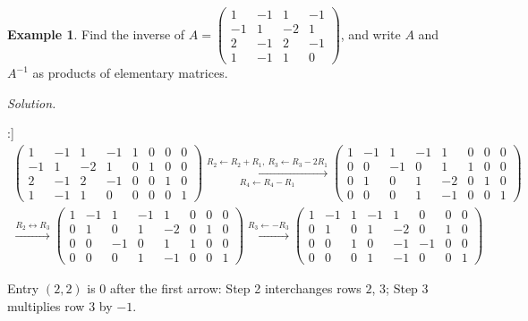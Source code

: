 \documentclass[12pt]{article}
\theoremstyle{definition}
\newtheorem{example}[theorem]{Example}
\begin{document}
\begin{example}\label{b2.20}
Find the inverse of \(A=\left(\begin{smallmatrix}1&-1&1&-1\\-1&1&-2&1\\2&-1&2&-1\\1&-1&1&0\end{smallmatrix}\right)\),
and write \(A\) and \(A^{-1}\) as products of elementary matrices.
\end{example}
\textit{Solution.}
\begin{board}[Forward elimination of \([A\mid I_4]\):]
\[
\begin{gathered}
\left(\begin{array}{cccc|cccc}1&-1&1&-1&1&0&0&0\\-1&1&-2&1&0&1&0&0\\2&-1&2&-1&0&0&1&0\\1&-1&1&0&0&0&0&1\end{array}\right)
\xrightarrow[R_4\leftarrow R_4-R_1]{R_2\leftarrow R_2+R_1,\ R_3\leftarrow R_3-2R_1}
\left(\begin{array}{cccc|cccc}1&-1&1&-1&1&0&0&0\\0&0&-1&0&1&1&0&0\\0&1&0&1&-2&0&1&0\\0&0&0&1&-1&0&0&1\end{array}\right)
\\
\xrightarrow{R_2\leftrightarrow R_3}
\left(\begin{array}{cccc|cccc}1&-1&1&-1&1&0&0&0\\0&1&0&1&-2&0&1&0\\0&0&-1&0&1&1&0&0\\0&0&0&1&-1&0&0&1\end{array}\right)
\xrightarrow{R_3\leftarrow-R_3}
\left(\begin{array}{cccc|cccc}1&-1&1&-1&1&0&0&0\\0&1&0&1&-2&0&1&0\\0&0&1&0&-1&-1&0&0\\0&0&0&1&-1&0&0&1\end{array}\right)
\end{gathered}
\]
\end{board}
Entry \((2,2)\) is \(0\) after the first arrow: Step 2 interchanges rows \(2\), \(3\); Step 3 multiplies row \(3\) by
\(-1\).
\end{document}
